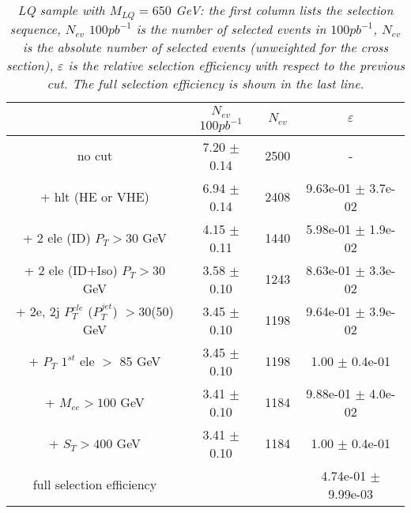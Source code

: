\begin{table}[htbp]
\begin{center}
\begin{tabular}{|c|c|c|c|}
\hline
\hline
 & $N_{ev}$ $100pb^{-1}$ & $N_{ev}$ & $\varepsilon$ \\
\hline
\hline

no cut &7.20 $\pm$ 0.14& 2500 & - \\
+ hlt (HE or VHE) &6.94 $\pm$ 0.14& 2408 & 9.63e-01 $\pm$ 3.7e-02\\
+ 2 ele (ID) $P_{T} >30$ GeV &4.15 $\pm$ 0.11& 1440 & 5.98e-01 $\pm$ 1.9e-02\\
+ 2 ele (ID+Iso) $P_{T} >30$ GeV &3.58 $\pm$ 0.10 & 1243 & 8.63e-01 $\pm$ 3.3e-02\\
+ 2e, 2j $P_{T}^{ele}$ ($P_{T}^{jet}$) $>$30(50) GeV &3.45 $\pm$ 0.10& 1198 & 9.64e-01 $\pm$ 3.9e-02\\
+ $P_{T}$ $1^{st}$ ele $>$ 85 GeV &3.45 $\pm$ 0.10& 1198 & 1.00 $\pm$ 0.4e-01\\
+ $M_{ee} >100$ GeV&3.41 $\pm$ 0.10& 1184 & 9.88e-01 $\pm$ 4.0e-02\\
+ $S_{T} >400$ GeV &3.41 $\pm$ 0.10& 1184 & 1.00 $\pm$ 0.4e-01\\
\hline

full selection efficiency& &  & 4.74e-01 $\pm$ 9.99e-03\\
\hline
\end{tabular}
\end{center}
\caption{\small \sl LQ sample with $M_{LQ}=650$ GeV: the first column lists the selection sequence, $N_{ev}$ $100pb^{-1}$ is the number of selected events in $100pb^{-1}$, $N_{ev}$ is the absolute number of selected events (unweighted for the cross section), $\varepsilon$ is the relative selection efficiency with respect to the previous cut. The full selection efficiency is shown in the last line.}
\label{tab:selection_effic_650}
\end{table}



